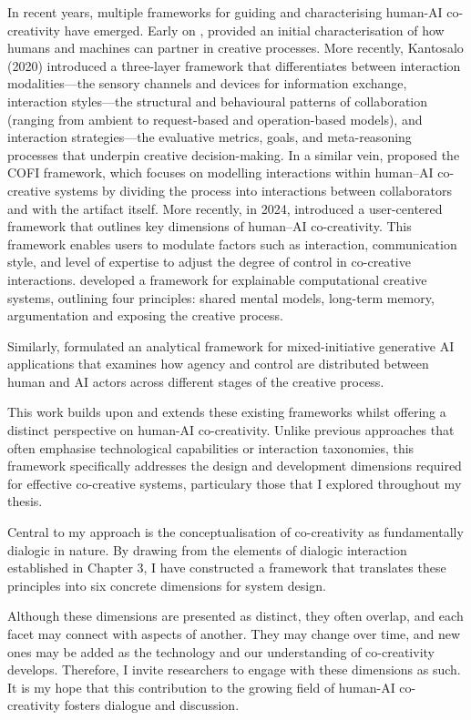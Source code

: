 In recent years, multiple frameworks for guiding and characterising human-AI co-creativity have emerged. Early on \cite{Lubart2005-zi}, provided an initial characterisation of how humans and machines can partner in creative processes. More recently, Kantosalo (2020) introduced a three-layer framework that differentiates between interaction modalities—the sensory channels and devices for information exchange, interaction styles—the structural and behavioural patterns of collaboration (ranging from ambient to request-based and operation-based models), and interaction strategies—the evaluative metrics, goals, and meta-reasoning processes that underpin creative decision-making. In a similar vein, \cite{Rezwana2022-gg} proposed the COFI framework, which focuses on modelling interactions within human–AI co-creative systems by dividing the process into interactions between collaborators and with the artifact itself. More recently, in 2024, \cite{Moruzzi2024-cq} introduced a user-centered framework that outlines key dimensions of human–AI co-creativity. This framework enables users to modulate factors such as interaction, communication style, and level of expertise to adjust the degree of control in co-creative interactions. \cite{Llano2022-ti} developed a framework for explainable computational creative systems, outlining four principles: shared mental models, long-term memory, argumentation and exposing the creative process.

Similarly, \cite{Muller2020-nv} formulated an analytical framework for mixed-initiative generative AI applications that examines how agency and control are distributed between human and AI actors across different stages of the creative process.

This work builds upon and extends these existing frameworks whilst offering a distinct perspective on human-AI co-creativity. Unlike previous approaches that often emphasise technological capabilities or interaction taxonomies, this framework specifically addresses the design and development dimensions required for effective co-creative systems, particulary those that I explored throughout my thesis.

Central to my approach is the conceptualisation of co-creativity as fundamentally dialogic in nature. By drawing from the elements of dialogic interaction established in Chapter 3, I have constructed a framework that translates these principles into six concrete dimensions for system design. 

Although these dimensions are presented as distinct, they often overlap, and each facet may connect with aspects of another. They may change over time, and new ones may be added as the technology and our understanding of co-creativity develops. Therefore, I invite researchers to engage with these dimensions as such. It is my hope that this contribution to the growing field of human-AI co-creativity fosters dialogue and discussion. 


